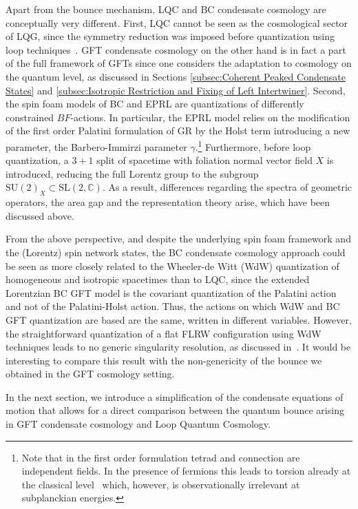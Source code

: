\documentclass[11pt,a4paper]{article}
\newcommand{\C}{\mathbb C}
\newcommand{\SU}{\text{SU$(2)$}}
\newcommand{\SL}{\text{SL$(2,\C)$}}
\begin{document}
Apart from the bounce mechanism, LQC and BC condensate cosmology are conceptually very different. First, LQC cannot be seen as the cosmological sector of LQG, since the symmetry reduction was imposed before quantization using loop techniques~\cite{Wilson-Ewing:2016yan}. GFT condensate cosmology on the other hand is in fact a part of the full framework of GFTs since one considers the adaptation to cosmology on the quantum level, as discussed in Sections \ref{subsec:Coherent Peaked Condensate States} and \ref{subsec:Isotropic Restriction and Fixing of Left Intertwiner}. Second, the spin foam models of BC and EPRL are quantizations of differently constrained $BF$-actions. In particular, the EPRL model relies on the modification of the first order Palatini formulation of GR by the Holst term introducing a new parameter, the Barbero-Immirzi parameter $\gamma$.\footnote{Note that in the first order formulation tetrad and connection are independent fields. In the presence of fermions this leads to torsion already at the classical level~\cite{Freidel:2005sn,Perez:2005pm} which, however, is observationally irrelevant at subplanckian energies.} Furthermore, before loop quantization, a $3+1$ split of spacetime with foliation normal vector field $X$ is introduced, reducing the full Lorentz group to the subgroup $\SU_X\subset\SL$. As a result, differences regarding the spectra of geometric operators, the area gap and the representation theory arise, which have been discussed above.

From the above perspective, and despite the underlying spin foam framework and the (Lorentz) spin network states, the BC condensate cosmology approach could be seen as more closely related to the Wheeler-de Witt (WdW) quantization of homogeneous and isotropic spacetimes than to LQC, since the extended Lorentzian BC GFT model is the covariant quantization of the Palatini action and not of the Palatini-Holst action. Thus, the actions on which WdW and BC GFT quantization are based are the same, written in different variables. However, the straightforward quantization of a flat FLRW configuration using WdW techniques leads to no generic singularity resolution, as discussed in~\cite{Kiefer2012,Hamber2009}. It would be interesting to compare this result with the non-genericity of the bounce we obtained in the GFT cosmology setting.

In the next section, we introduce a simplification of the condensate equations of motion that allows for a direct comparison between the quantum bounce arising in GFT condensate cosmology and Loop Quantum Cosmology.
\end{document}
